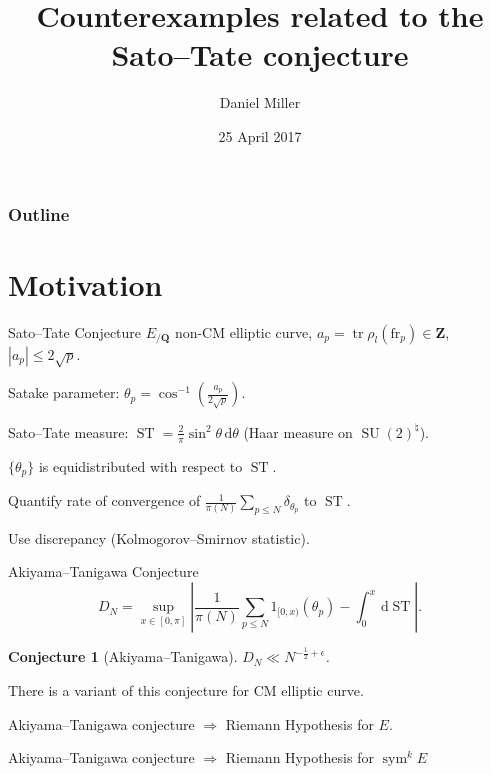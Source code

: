 \documentclass[handout]{beamer}
\title{Counterexamples related to the Sato--Tate conjecture}
\author{Daniel Miller}
\institute{Cornell University}
\date{25 April 2017}
\DeclareMathOperator{\ST}{ST}
\DeclareMathOperator{\SU}{SU}
\DeclareMathOperator{\sym}{sym}
\DeclareMathOperator{\tr}{tr}
\newcommand{\bQ}{\mathbf{Q}}
\newcommand{\bZ}{\mathbf{Z}}
\newcommand{\dd}{\mathrm{d}}
\newcommand{\frob}{\mathrm{fr}}
\newtheorem{conjecture}{Conjecture}
\begin{document}
\begin{frame}
\titlepage
\end{frame}

\begin{frame}
\frametitle{Outline}
\tableofcontents
\end{frame}





\section{Motivation}

\begin{frame}{Sato--Tate Conjecture}
$E_{/\bQ}$ non-CM elliptic curve, $a_p = \tr\rho_l(\frob_p)\in \bZ$, 
$|a_p|\leqslant 2\sqrt p$. 
\pause

Satake parameter: $\theta_p = \cos^{-1}\left( \frac{a_p}{2\sqrt p}\right)$. 
\pause

Sato--Tate measure: $\ST = \frac{2}{\pi} \sin^2 \theta\, \dd \theta$ (Haar 
measure on $\SU(2)^\natural$). 
\pause

\begin{theorem}[Taylor et.~al.]
$\{\theta_p\}$ is equidistributed with respect to $\ST$. 
\end{theorem}
\pause

Quantify rate of convergence of 
$\frac{1}{\pi(N)} \sum_{p\leqslant N} \delta_{\theta_p}$ to $\ST$. 
\pause

Use discrepancy (Kolmogorov--Smirnov statistic). 
\end{frame}


\begin{frame}{Akiyama--Tanigawa Conjecture}
\[
	D_N = \sup_{x\in [0,\pi]}\left| \frac{1}{\pi(N)} \sum_{p\leqslant N} 1_{[0,x)}(\theta_p) - \int_0^x \, \dd\ST\right| .
\]
\pause

\begin{conjecture}[Akiyama--Tanigawa]
$D_N \ll N^{-\frac 1 2 + \epsilon}$. 
\end{conjecture}
\pause

There is a variant of this conjecture for CM elliptic curve.
\pause

\begin{theorem}
Akiyama--Tanigawa conjecture $\Rightarrow$ Riemann Hypothesis for $E$.
\end{theorem}
\pause

\begin{theorem}[Mazur]
Akiyama--Tanigawa conjecture $\Rightarrow$ Riemann Hypothesis for $\sym^k E$
\end{theorem}
\end{frame}
\end{document}
